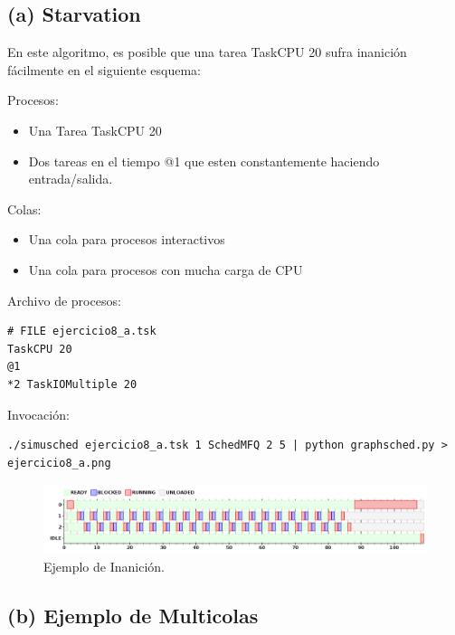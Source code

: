 \subsection{(a) Starvation}

En este algoritmo, es posible que una tarea TaskCPU 20 sufra inanici\'on f\'acilmente en el siguiente esquema:

Procesos:
\begin{itemize}
 \item Una Tarea TaskCPU 20
 \item Dos tareas en el tiempo @1 que esten constantemente haciendo entrada/salida.
\end{itemize}

Colas:
\begin{itemize}
 \item Una cola para procesos interactivos
 \item Una cola para procesos con mucha carga de CPU
\end{itemize}

Archivo de procesos:

\begin{framed}
\begin{verbatim}
# FILE ejercicio8_a.tsk
TaskCPU 20
@1
*2 TaskIOMultiple 20
\end{verbatim}
\end{framed}

Invocaci\'on:

\begin{framed}
\begin{verbatim}
./simusched ejercicio8_a.tsk 1 SchedMFQ 2 5 | python graphsched.py > ejercicio8_a.png
\end{verbatim}
\end{framed}

\begin{figure}[h!]
  \caption{Ejemplo de Inanici\'on.}
  \centering
    \includegraphics[width=1\textwidth]{img/ejercicio8_a.png}
\end{figure}

\subsection{(b) Ejemplo de Multicolas}

